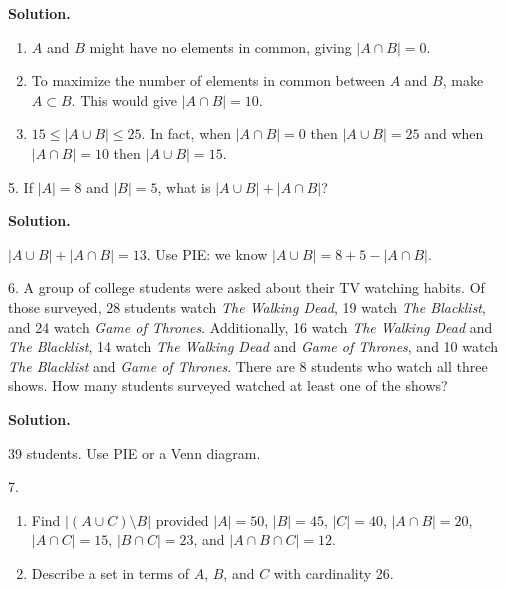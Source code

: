 \documentclass[10pt,]{book}
\theoremstyle{plain}
\theoremstyle{definition}
\theoremstyle{definition}
\theoremstyle{definition}
\numberwithin{equation}{section}
\newcommand{\card}[1]{\left| #1 \right|}
\begin{document}
\begin{exerciselist}
\par\smallskip
\par\smallskip
\noindent\textbf{Solution.}\hypertarget{solution-71}{}\quad

          \leavevmode%
\begin{enumerate}[label=(\alph*)]
\item\hypertarget{li-394}{}\(A\) and \(B\) might have no elements in common, giving \(\card{A\cap B} = 0\).%
\item\hypertarget{li-395}{}To maximize the number of elements in common between \(A\) and \(B\), make \(A \subset B\).  This would give \(\card{A \cap B} = 10\).%
\item\hypertarget{li-396}{}\(15 \le \card{A \cup B} \le 25\).  In fact, when \(\card{A \cap B} = 0\) then \(\card{A \cup B} = 25\) and when \(\card{A \cap B} = 10\) then \(\card{A \cup B} = 15\). %
\end{enumerate}

\item[5.]\hypertarget{exercise-46}{}
          If \(\card{A} = 8\) and \(\card{B} = 5\), what is \(\card{A \cup B} + \card{A \cap B}\)?
\par\smallskip
\par\smallskip
\noindent\textbf{Solution.}\hypertarget{solution-72}{}\quad

          \(\card{A \cup B} + \card{A \cap B} = 13\).  Use PIE: we know \(\card{A \cup B} = 8 + 5 - \card{A \cap B}\).
\item[6.]\hypertarget{exercise-47}{}
          A group of college students were asked about their TV watching habits. Of those surveyed, 28 students watch \emph{The Walking Dead}, 19 watch \emph{The Blacklist}, and 24 watch \emph{Game of Thrones}. Additionally, 16 watch \emph{The Walking Dead} and \emph{The Blacklist}, 14 watch \emph{The Walking Dead} and \emph{Game of Thrones}, and 10 watch \emph{The Blacklist} and \emph{Game of Thrones}. There are 8 students who watch all three shows. How many students surveyed watched at least one of the shows?
\par\smallskip
\par\smallskip
\noindent\textbf{Solution.}\hypertarget{solution-73}{}\quad

          39 students.  Use PIE or a Venn diagram.
\item[7.]\hypertarget{exercise-48}{}
          \leavevmode%
\begin{enumerate}[label=(\alph*)]
\item\hypertarget{li-397}{}
              Find \(\card{(A \cup C)\setminus B}\) provided \(\card{A} = 50\), \(\card{B} = 45\), \(\card{C} = 40\), \(\card{A\cap B} = 20\), \(\card{A \cap C} = 15\), \(\card{B \cap C} = 23\), and \(\card{A \cap B \cap C} = 12\).
\item\hypertarget{li-398}{}
              Describe a set in terms of \(A\), \(B\), and \(C\) with cardinality 26.
\end{enumerate}


\end{exerciselist}
\end{document}
